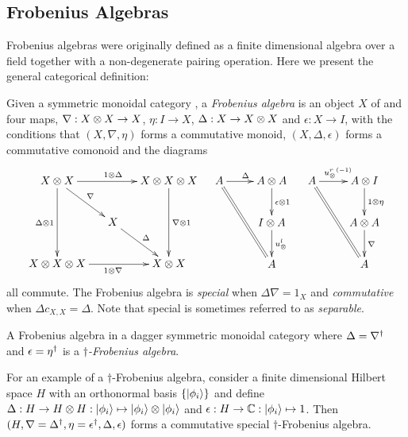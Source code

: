 \subsection{Frobenius Algebras} %
\label{sub:frobenius_algebras}
Frobenius algebras were originally defined as a finite dimensional algebra over a field together with a
non-degenerate pairing operation. Here we present the general categorical definition:

\begin{definition}\label{def:frobeniusalgebra}
  Given a symmetric monoidal category \cD, a \emph{Frobenius algebra} is an object $X$ of \cD and
  four maps, $\nabla :X\otimes X \to X$, $\eta: I \to X$, $\Delta: X\to X\otimes X$ and $\epsilon:X\to I$, with
  the conditions that $(X,\nabla,\eta)$ forms a commutative monoid, $(X,\Delta, \epsilon)$ forms a
  commutative comonoid and the diagrams
  \[
    \xymatrix@C-10pt{
      X\*X \ar[rr]^{1\*\Delta} \ar[dd]_{\Delta \* 1} \ar[dr]^{\nabla}
        && X\*X\*X \ar[dd]^{\nabla\*1}\\
      & X\ar[dr]^{\Delta}\\
      X\*X\*X\ar[rr]_{1\*\nabla}  && X\*X
    }\quad
    \xymatrix{
      A \ar[r]^{\Delta} \ar@{=}[ddr] & A\*A \ar[d]^{\epsilon\*1} \\
      & I\*A \ar[d]^{\usl}\\
      & A
    }\quad
    \xymatrix{
      A \ar[r]^{\inv{\usr}} \ar@{=}[ddr] & A\*I \ar[d]^{1\*\eta}\\
      & A\*A \ar[d]^{\nabla} \\
      & A
    }
  \]
  all commute. The Frobenius algebra is \emph{special} when $\Delta \nabla = 1_{X}$ and
  \emph{commutative} when $\Delta c_{X,X} = \Delta$. Note that special is sometimes referred to as
  \emph{separable}.
\end{definition}
\begin{definition}\label{def:daggerfrob}
  A Frobenius algebra in a dagger symmetric monoidal category where $\Delta = {\nabla}^{\dagger}$ and
  $\epsilon={\eta}^{\dagger}$ is a $\dagger$\emph{-Frobenius algebra}.
\end{definition}
For an example of a $\dagger$-Frobenius algebra, consider a finite dimensional Hilbert space $H$
with an orthonormal basis $\{\left\vert{\phi_{i}}\right\rangle\}$ and define $\Delta:H\to H\otimes H: \left\vert{\phi_{i}}\right\rangle\mapsto
\left\vert{\phi_{i}}\right\rangle \otimes \left\vert{\phi_{i}}\right\rangle$ and $\epsilon : H\to \mathbb{C} : \left\vert{\phi_{i}}\right\rangle \mapsto 1$. Then $(H,
\nabla={\Delta}^{\dagger}, \eta={\epsilon}^{\dagger}, \Delta, \epsilon)$ forms a commutative special
$\dagger$-Frobenius algebra.


